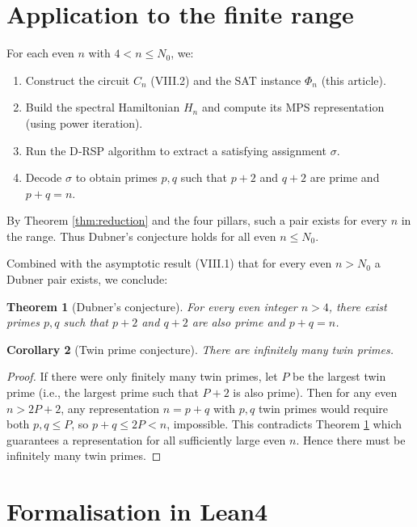 \documentclass[11pt,a4paper]{article}
\newtheorem{theorem}{Theorem}[section]
\newtheorem{corollary}[theorem]{Corollary}
\begin{document}
\section{Application to the finite range}

For each even \(n\) with \(4 < n \le N_0\), we:
\begin{enumerate}
\item Construct the circuit \(C_n\) (VIII.2) and the SAT instance \(\Phi_n\) (this article).
\item Build the spectral Hamiltonian \(H_n\) and compute its MPS representation (using power iteration).
\item Run the D‑RSP algorithm to extract a satisfying assignment \(\sigma\).
\item Decode \(\sigma\) to obtain primes \(p,q\) such that \(p+2\) and \(q+2\) are prime and \(p+q=n\).
\end{enumerate}
By Theorem \ref{thm:reduction} and the four pillars, such a pair exists for every \(n\) in the range. Thus Dubner's conjecture holds for all even \(n \le N_0\).

Combined with the asymptotic result (VIII.1) that for every even \(n > N_0\) a Dubner pair exists, we conclude:

\begin{theorem}[Dubner's conjecture]\label{thm:dubner}
For every even integer \(n > 4\), there exist primes \(p,q\) such that \(p+2\) and \(q+2\) are also prime and \(p+q = n\).
\end{theorem}

\begin{corollary}[Twin prime conjecture]\label{cor:twin}
There are infinitely many twin primes.
\end{corollary}
\begin{proof}
If there were only finitely many twin primes, let \(P\) be the largest twin prime (i.e., the largest prime such that \(P+2\) is also prime). Then for any even \(n > 2P+2\), any representation \(n = p+q\) with \(p,q\) twin primes would require both \(p,q \le P\), so \(p+q \le 2P < n\), impossible. This contradicts Theorem \ref{thm:dubner} which guarantees a representation for all sufficiently large even \(n\). Hence there must be infinitely many twin primes.
\end{proof}

\section{Formalisation in Lean4}
\end{document}
